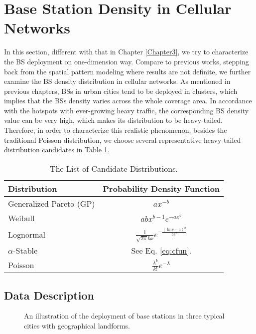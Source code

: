 \section{Base Station Density in Cellular Networks} \label{sec4-bsden}
In this section, different with that in Chapter \ref{Chapter3}, we try to characterize the BS deployment on one-dimension way. Compare to previous works, stepping back from the spatial pattern modeling where results are not definite, we further examine the BS density distribution in cellular networks. As mentioned in previous chapters, BSs in urban cities tend to be deployed in clusters, which implies that the BSs density varies across the whole coverage area. In accordance with the hotspots with ever-growing heavy traffic, the corresponding BS density value can be very high, which makes its distribution to be heavy-tailed. Therefore, in order to characterize this realistic phenomenon, besides the traditional Poisson distribution, we choose several representative heavy-tailed distribution candidates in Table \ref{distribution}.

\begin{table}[htbp]
\centering
  \caption{The List of Candidate Distributions.}
  \renewcommand\arraystretch{1.5}
    \begin{tabular}{l|c}
    \toprule
    Distribution & Probability Density Function \\
    \midrule
    Generalized Pareto (GP) & $ax^{-b}$ \\
    Weibull                 & $abx^{b-1}e^{-ax^b}$ \\
    Lognormal               & $\frac{1}{\sqrt{2\pi}bx}e^{-\frac{(\ln x-a)^2}{2b^2}}$ \\
    $\alpha$-Stable         & See Eq. \ref{eq:cfun}. \\
    Poisson                 & $\frac{{\lambda}^k}{k!}e^{-\lambda}$ \\
    \bottomrule
    \end{tabular}%
  \label{distribution}%
\end{table}%

\subsection{Data Description}
\begin{figure*}
	\centering
	\hspace{1em}
	\hspace{1em}
	\hspace{1in}
	\caption{An illustration of the deployment of base stations in three typical cities with geographical landforms.}
	\label{fig:maps}
\end{figure*}

